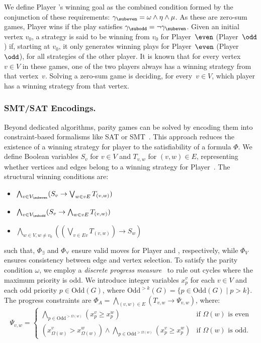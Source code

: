 \documentclass[a4paper,UKenglish,cleveref, autoref, thm-restate, anonymous]{lipics-v2021}
\begin{document}
We define Player \even's winning goal as the combined condition formed by the conjunction of these requirements:
$\gamma_{\subeven} = \omega \wedge \eta \wedge \mu$. As these are zero-sum games, Player \odd wins if the play satisfies $\gamma_{\subodd} = \neg \gamma_{\subeven}$.
%
Given an initial vertex $v_0$, a strategy is said to be winning from $v_0$ for Player~$\even$ (Player~$\odd$) if, starting at $v_0$, it only generates winning plays for Player~$\even$ (Player~$\odd$), for all strategies of the other player. It is known that for every vertex~$v\in V$ in these games, one of the two players always has a winning strategy from that vertex~$v$. Solving a zero-sum game is deciding, for every~$v\in V$, which player has a winning strategy from that vertex.

\subsubsection{SMT/SAT Encodings.}\label{sec:satencoding}

Beyond dedicated algorithms, parity games can be solved by encoding them into constraint-based formalisms like SAT or SMT~\cite{Heljanko:2012}. This approach reduces the existence of a winning strategy for player \even to the satisfiability of a formula $\Phi$. We define Boolean variables $S_v$ for $v \in V$ and $T_{v,w}$ for $(v, w) \in E$, representing whether vertices and edges belong to a winning strategy for Player~\even. The structural winning conditions are:

\begin{itemize}[leftmargin=1.5cm, itemsep=1.0ex, parsep=0pt]
    \item [$\Phi_\exists =$] $\bigwedge_{v \in V_{\subeven}} (S_v \rightarrow \bigvee_{w \in vE} T_{(v,w)})$ 
    \item [$\Phi_\forall =$] $\bigwedge_{v \in V_{\subodd}} (S_v \rightarrow \bigwedge_{w \in vE} T_{(v,w)})$
    \item [$\Phi_V =$] $\bigwedge_{w \in V, w \neq v_0} \left( \left(\bigvee_{v \in Ev} T_{(v,w)}\right) \rightarrow S_w \right)$
\end{itemize}
such that, 
$\Phi_\exists$ and $\Phi_\forall$ ensure valid moves for Player \even and \odd, respectively, while $\Phi_V$ ensures consistency between edge and vertex selection. To satisfy the parity condition $\omega$, we employ a \textit{discrete progress measure}~\cite{Jurdziński:2000} to rule out cycles where the maximum priority is odd. We introduce integer variables $x_p^v$ for each $v \in V$ and each odd priority $p \in \text{Odd}(G)$, where $\text{Odd}^{>k}(G) = \{p \in \text{Odd}(G) \mid p > k\}$. The progress constraints are $\Phi_A = \bigwedge_{(v,w) \in E} (T_{v,w} \to \Psi_{v,w})$, where:
%
\[
\Psi_{v,w} = 
\begin{cases} 
\bigwedge_{p \in \text{Odd}^{>\Omega(w)}} (x_p^v \geq x_p^w) & \text{if } \Omega(w) \text{ is even} \\
(x_{\Omega(w)}^v > x_{\Omega(w)}^w) \land \bigwedge_{p \in \text{Odd}^{>\Omega(w)}} (x_p^v \geq x_p^w) & \text{if } \Omega(w) \text{ is odd}.
\end{cases}
\]
\end{document}
